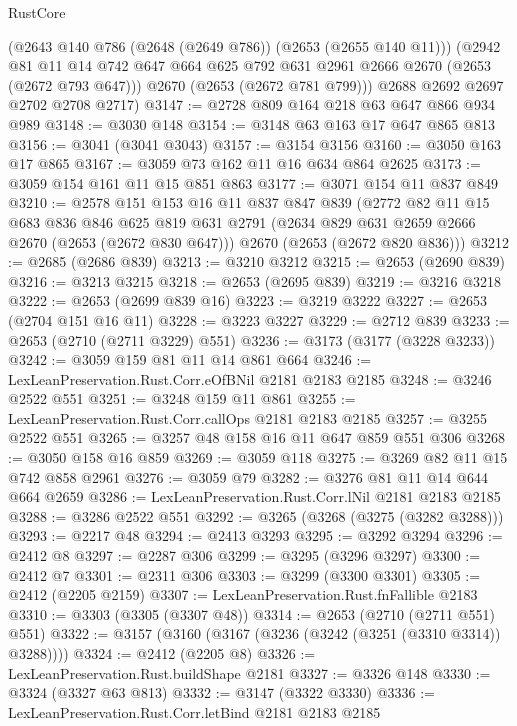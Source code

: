 \begin{lexlean}{RustCore}
\begin{coremodule}
        (@2643 @140 @786 (@2648 (@2649 @786)) (@2653 (@2655 @140 @11)))
        (@2942
          @81
          @11
          @14
          @742
          @647
          @664
          @625
          @792
          @631
          @2961
          @2666
          @2670
          (@2653 (@2672 @793 @647)))
        @2670
        (@2653 (@2672 @781 @799)))
      @2688
      @2692
      @2697
      @2702
      @2708
      @2717)
@3147 := @2728 @809 @164 @218 @63 @647 @866 @934 @989
@3148 := @3030 @148
@3154 := @3148 @63 @163 @17 @647 @865 @813
@3156 := @3041 (@3041 @3043)
@3157 := @3154 @3156
@3160 := @3050 @163 @17 @865
@3167 := @3059 @73 @162 @11 @16 @634 @864 @2625
@3173 := @3059 @154 @161 @11 @15 @851 @863
@3177 := @3071 @154 @11 @837 @849
@3210 := @2578
    @151
    @153
    @16
    @11
    @837
    @847
    @839
    (@2772
      @82
      @11
      @15
      @683
      @836
      @846
      @625
      @819
      @631
      @2791
      (@2634 @829 @631 @2659 @2666 @2670 (@2653 (@2672 @830 @647)))
      @2670
      (@2653 (@2672 @820 @836)))
@3212 := @2685 (@2686 @839)
@3213 := @3210 @3212
@3215 := @2653 (@2690 @839)
@3216 := @3213 @3215
@3218 := @2653 (@2695 @839)
@3219 := @3216 @3218
@3222 := @2653 (@2699 @839 @16)
@3223 := @3219 @3222
@3227 := @2653 (@2704 @151 @16 @11)
@3228 := @3223 @3227
@3229 := @2712 @839
@3233 := @2653 (@2710 (@2711 @3229) @551)
@3236 := @3173 (@3177 (@3228 @3233))
@3242 := @3059 @159 @81 @11 @14 @861 @664
@3246 := LexLeanPreservation.Rust.Corr.eOfBNil @2181 @2183 @2185
@3248 := @3246 @2522 @551
@3251 := @3248 @159 @11 @861
@3255 := LexLeanPreservation.Rust.Corr.callOps @2181 @2183 @2185
@3257 := @3255 @2522 @551
@3265 := @3257 @48 @158 @16 @11 @647 @859 @551 @306
@3268 := @3050 @158 @16 @859
@3269 := @3059 @118
@3275 := @3269 @82 @11 @15 @742 @858 @2961
@3276 := @3059 @79
@3282 := @3276 @81 @11 @14 @644 @664 @2659
@3286 := LexLeanPreservation.Rust.Corr.lNil @2181 @2183 @2185
@3288 := @3286 @2522 @551
@3292 := @3265 (@3268 (@3275 (@3282 @3288)))
@3293 := @2217 @48
@3294 := @2413 @3293
@3295 := @3292 @3294
@3296 := @2412 @8
@3297 := @2287 @306
@3299 := @3295 (@3296 @3297)
@3300 := @2412 @7
@3301 := @2311 @306
@3303 := @3299 (@3300 @3301)
@3305 := @2412 (@2205 @2159)
@3307 := LexLeanPreservation.Rust.fnFallible @2183
@3310 := @3303 (@3305 (@3307 @48))
@3314 := @2653 (@2710 (@2711 @551) @551)
@3322 := @3157 (@3160 (@3167 (@3236 (@3242 (@3251 (@3310 @3314)) @3288))))
@3324 := @2412 (@2205 @8)
@3326 := LexLeanPreservation.Rust.buildShape @2181
@3327 := @3326 @148
@3330 := @3324 (@3327 @63 @813)
@3332 := @3147 (@3322 @3330)
@3336 := LexLeanPreservation.Rust.Corr.letBind @2181 @2183 @2185

\end{coremodule}
\end{lexlean}

